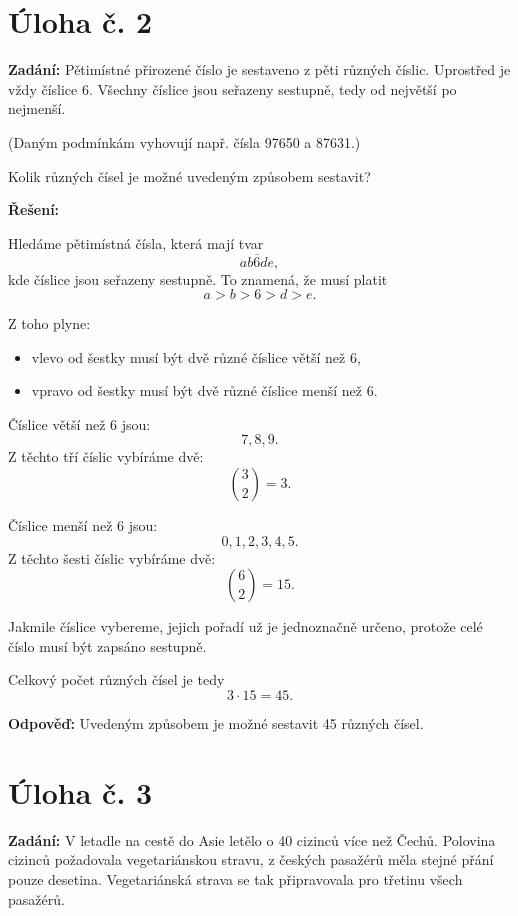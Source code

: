 \documentclass[12pt,a4paper]{article}
\begin{document}
\newpage
\section*{Úloha č. 2}

\textbf{Zadání:}  
Pětimístné přirozené číslo je sestaveno z pěti různých číslic. Uprostřed je vždy číslice 6. Všechny číslice jsou seřazeny sestupně, tedy od největší po nejmenší.

(Daným podmínkám vyhovují např. čísla 97650 a 87631.)

Kolik různých čísel je možné uvedeným způsobem sestavit?

\bigskip

\textbf{Řešení:}

Hledáme pětimístná čísla, která mají tvar
\[
\overline{ab6de},
\]
kde číslice jsou seřazeny sestupně. To znamená, že musí platit
\[
a>b>6>d>e.
\]

Z toho plyne:
\begin{itemize}
    \item vlevo od šestky musí být dvě různé číslice větší než 6,
    \item vpravo od šestky musí být dvě různé číslice menší než 6.
\end{itemize}

\medskip

Číslice větší než 6 jsou:
\[
7,8,9.
\]
Z těchto tří číslic vybíráme dvě:
\[
\binom{3}{2}=3.
\]

Číslice menší než 6 jsou:
\[
0,1,2,3,4,5.
\]
Z těchto šesti číslic vybíráme dvě:
\[
\binom{6}{2}=15.
\]

Jakmile číslice vybereme, jejich pořadí už je jednoznačně určeno, protože celé číslo musí být zapsáno sestupně.

Celkový počet různých čísel je tedy
\[
3 \cdot 15 = 45.
\]

\bigskip

\textbf{Odpověď:}  
Uvedeným způsobem je možné sestavit 45 různých čísel.

\newpage
\section*{Úloha č. 3}

\textbf{Zadání:}  
V letadle na cestě do Asie letělo o 40 cizinců více než Čechů. Polovina cizinců požadovala vegetariánskou stravu, z českých pasažérů měla stejné přání pouze desetina. Vegetariánská strava se tak připravovala pro třetinu všech pasažérů.
\end{document}
